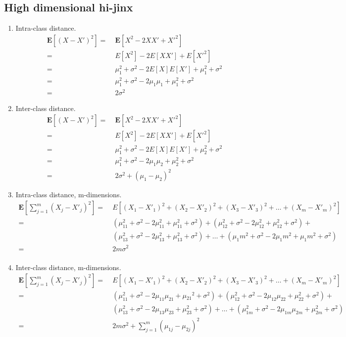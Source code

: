 \documentclass[english]{article}
\newcommand{\E}{\mathbf{E}}
\begin{document}
\begin{enumerate}
\section{High dimensional hi-jinx}

\begin{enumerate}
\item Intra-class distance.
  \begin{align*}
    \E[(X - X')^2] =&\; \E[X^2 -2XX' +X'^2] \\
    =&\; E[X^2] - 2E[XX'] + E[X'^2] \\
    =&\;\mu_1^2 + \sigma^2 - 2E[X]E[X'] + \mu_1^2 + \sigma^2 \\
    =&\;\mu_1^2 + \sigma^2 - 2\mu_1 \mu_1 + \mu_1^2 + \sigma^2\\
    =&\; 2 \sigma^2
  \end{align*}

\item Inter-class distance.
  \begin{align*}
    \E[(X - X')^2] =&\; \E[X^2 -2XX' +X'^2] \\
    =&\; E[X^2] - 2E[XX'] + E[X'^2] \\
    =&\;\mu_1^2 + \sigma^2 - 2E[X]E[X'] + \mu_2^2 + \sigma^2 \\
    =&\;\mu_1^2 + \sigma^2 - 2\mu_1 \mu_2 + \mu_2^2 + \sigma^2\\
    =&\; 2 \sigma^2 + (\mu_1 - \mu_2)^2
  \end{align*}

\item Intra-class distance, m-dimensions.
  \begin{align*}
    \E[\sum_{j=1}^m (X_{j} - X'_{j})^2] =&\; E[(X_1 - X'_1)^2 + (X_2 - X'_2)^2 + (X_3 - X'_3)^2 + \dots + (X_m - X'_m)^2] \\
    =&\; (\mu_11^2 + \sigma^2 - 2\mu_11^2+ \mu_11^2 + \sigma^2) + (\mu_12^2 + \sigma^2 - 2\mu_12^2+ \mu_12^2 + \sigma^2) + \\
     &\; (\mu_13^2 + \sigma^2 - 2\mu_13^2+ \mu_13^2 + \sigma^2) + \dots + (\mu_1m^2 + \sigma^2 - 2\mu_1m^2+ \mu_1m^2 + \sigma^2) \\
    = &\; 2m\sigma^2\\
  \end{align*}

\item Inter-class distance, m-dimensions.
  \begin{align*}
    \E[\sum_{j=1}^m (X_{j} - X'_{j})^2] =&\; E[(X_1 - X'_1)^2 + (X_2 - X'_2)^2 + (X_3 - X'_3)^2 + \dots + (X_m - X'_m)^2] \\
    =&\; (\mu_{11}^2 + \sigma^2 - 2\mu_{11}\mu_{21}+ \mu{_21}^2 + \sigma^2) + (\mu_{12}^2 + \sigma^2 - 2\mu_{12}\mu_{22}+ \mu_{22}^2 + \sigma^2) + \\
     &\; (\mu_{13}^2 + \sigma^2 - 2\mu_{13}\mu_{23}+ \mu_{23}^2 + \sigma^2) + \dots + (\mu_{1m}^2 + \sigma^2 - 2\mu_{1m}\mu_{2m}+ \mu_{2m}^2+ \sigma^2) \\
    =&\; 2m\sigma^2 + \sum_{j=1}^{m} (\mu_{1j}-\mu_{2j})^2 
  \end{align*}


\end{enumerate}
\end{enumerate}
\end{document}
